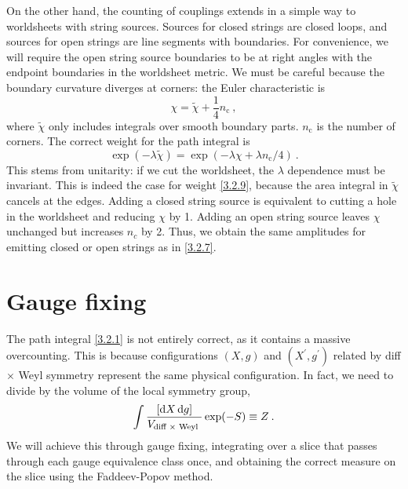 On the other hand, the counting of couplings extends in a simple way to worldsheets with string sources. Sources for closed strings are closed loops, and sources for open strings are line segments with boundaries. For convenience, we will require the open string source boundaries to be at right angles with the endpoint boundaries in the worldsheet metric. We must be careful because the boundary curvature diverges at corners: the Euler characteristic is    
\begin{equation}
	\chi=\tilde{\chi}+\frac{1}{4} n_{\mathrm{c}} \:, \label{3.2.8}
\end{equation}
where $\tilde{\chi}$ only includes integrals over smooth boundary parts. $n_\mathrm{c}$ is the number of corners.    
The correct weight for the path integral is    
\begin{equation}\label{3.2.9}
	\exp (-\lambda \tilde{\chi})=\exp (-\lambda \chi+\lambda n_{\mathrm{c}} / 4) \:. 
\end{equation}
This stems from unitarity: if we cut the worldsheet, the $\lambda$ dependence must be invariant. This is indeed the case for weight \eqref{3.2.9}, because the area integral in $\tilde{\chi}$ cancels at the edges. Adding a closed string source is equivalent to cutting a hole in the worldsheet and reducing $\chi$ by 1.    
Adding an open string source leaves $\chi$ unchanged but increases $n_c$ by 2. Thus, we obtain the same amplitudes for emitting closed or open strings as in \eqref{3.2.7}.    

\section{\texorpdfstring{Gauge fixing}{3.3 Gauge fixing}} \label{sec:3.3}

The path integral \eqref{3.2.1} is not entirely correct, as it contains a massive overcounting. This is because configurations $(X, g)$ and $(X^{\prime}, g^{\prime})$ related by diff $\times$ Weyl symmetry represent the same physical configuration.    
In fact, we need to divide by the volume of the local symmetry group,    
\begin{equation}\label{3.3.1}
	\int \frac{[\mathrm{d} X\, \mathrm{d} g]}{V_{\text {diff } \times \text { Weyl }}} \exp (-S) \equiv Z \:.
\end{equation}
We will achieve this through gauge fixing, integrating over a slice that passes through each gauge equivalence class once, and obtaining the correct measure on the slice using the Faddeev-Popov method.    

